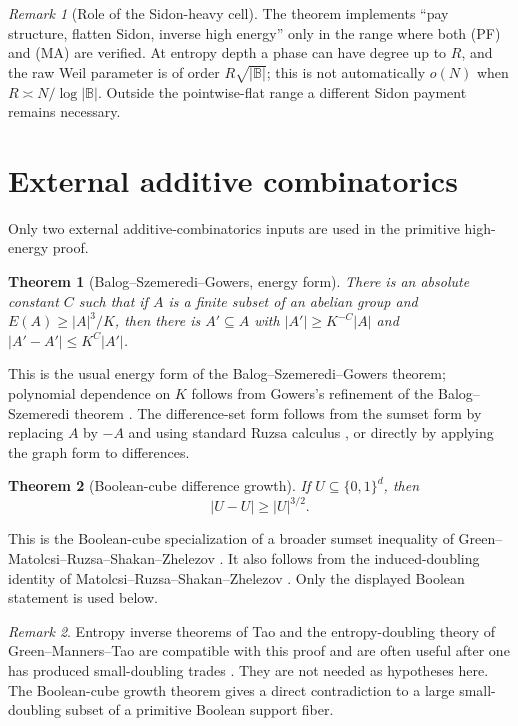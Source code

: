 \documentclass[12pt,a4paper]{amsart}
\numberwithin{equation}{section}
\newtheorem{theorem}{Theorem}[section]
\theoremstyle{remark}
\newtheorem{remark}[remark]{Remark}
\newcommand{\B}{\mathbb B}
\newcommand{\abs}[1]{\lvert #1\rvert}
\begin{document}
\begin{remark}[Role of the Sidon-heavy cell]
The theorem implements ``pay structure, flatten Sidon, inverse high energy''
only in the range where both \textup{(PF)} and \textup{(MA)} are verified.
At entropy depth a phase
can have degree up to \(R\), and the raw Weil parameter is of order
\(R\sqrt{\abs\B}\); this is not automatically \(o(N)\) when
\(R\asymp N/\log\abs\B\).  Outside the pointwise-flat range a different
Sidon payment remains necessary.
\end{remark}

\section{External additive combinatorics}\label{sec:additive-tools}

Only two external additive-combinatorics inputs are used in the primitive high-energy proof.

\begin{theorem}[Balog--Szemeredi--Gowers, energy form]\label{thm:bsg}
There is an absolute constant \(C\) such that if \(A\) is a finite subset of an abelian group and \(E(A)\ge \abs A^3/K\), then there is \(A'\subseteq A\) with \(\abs{A'}\ge K^{-C}\abs A\) and \(\abs{A'-A'}\le K^C\abs{A'}\).
\end{theorem}

This is the usual energy form of the Balog--Szemeredi--Gowers theorem; polynomial dependence on \(K\) follows from Gowers's refinement of the Balog--Szemeredi theorem \cite{BalogSzemeredi,GowersSzemeredi}.  The difference-set form follows from the sumset form by replacing \(A\) by \(-A\) and using standard Ruzsa calculus \cite{TaoVu}, or directly by applying the graph form to differences.

\begin{theorem}[Boolean-cube difference growth]\label{thm:quasicube}
If \(U\subseteq\{0,1\}^d\), then
\[
                  \abs{U-U}\ge \abs U^{3/2}.
\]
\end{theorem}

This is the Boolean-cube specialization of a broader sumset inequality
of Green--Matolcsi--Ruzsa--Shakan--Zhelezov
\cite{GreenMatolcsiRuzsaShakanZhelezov}.  It also follows from the
induced-doubling identity of Matolcsi--Ruzsa--Shakan--Zhelezov
\cite{MatolcsiRuzsaShakanZhelezov}.  Only the displayed Boolean statement
is used below.

\begin{remark}
Entropy inverse theorems of Tao and the entropy-doubling theory of Green--Manners--Tao are compatible with this proof and are often useful after one has produced small-doubling trades \cite{TaoEntropy,GreenMannersTao}.  They are not needed as hypotheses here.  The Boolean-cube growth theorem gives a direct contradiction to a large small-doubling subset of a primitive Boolean support fiber.
\end{remark}
\end{document}
